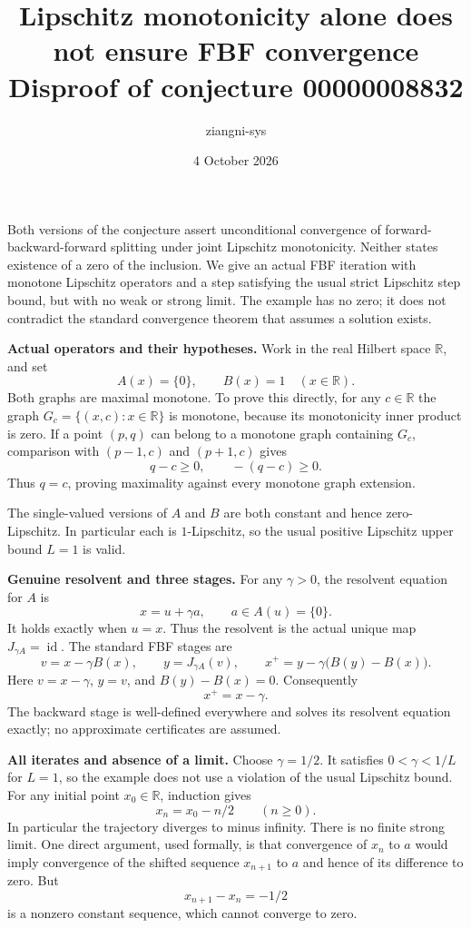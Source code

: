 \documentclass[11pt]{article}
\title{Lipschitz monotonicity alone does not ensure FBF convergence\\
\large Disproof of conjecture 00000008832}
\author{ziangni-sys}
\date{4 October 2026}
\begin{document}
\maketitle
Both versions of the conjecture assert unconditional convergence of
forward-backward-forward splitting under joint Lipschitz monotonicity.
Neither states existence of a zero of the inclusion. We give an actual
FBF iteration with monotone Lipschitz operators and a step satisfying
the usual strict Lipschitz step bound, but with no weak or strong limit.
The example has no zero; it does not contradict the standard convergence
theorem that assumes a solution exists.

\textbf{Actual operators and their hypotheses.}
Work in the real Hilbert space $\mathbb R$, and set
\[
 A(x)=\{0\},\qquad B(x)=1\quad(x\in\mathbb R).
\]
Both graphs are maximal monotone. To prove this directly, for any
$c\in\mathbb R$ the graph $G_c=\{(x,c):x\in\mathbb R\}$ is monotone,
because its monotonicity inner product is zero.
If a point $(p,q)$ can belong to a monotone graph containing $G_c$,
comparison with $(p-1,c)$ and $(p+1,c)$ gives
\[
 q-c\geq0,\qquad -(q-c)\geq0.
\]
Thus $q=c$, proving maximality against every monotone graph extension.

The single-valued versions of $A$ and $B$ are both constant and hence
zero-Lipschitz. In particular each is $1$-Lipschitz, so the usual
positive Lipschitz upper bound $L=1$ is valid.

\textbf{Genuine resolvent and three stages.}
For any $\gamma>0$, the resolvent equation for $A$ is
\[
 x=u+\gamma a,\qquad a\in A(u)=\{0\}.
\]
It holds exactly when $u=x$. Thus the resolvent is the actual unique map
$J_{\gamma A}=\operatorname{id}$.
The standard FBF stages are
\[
 v=x-\gamma B(x),\qquad
 y=J_{\gamma A}(v),\qquad
 x^+=y-\gamma\bigl(B(y)-B(x)\bigr).
\]
Here $v=x-\gamma$, $y=v$, and $B(y)-B(x)=0$. Consequently
\[
 x^+=x-\gamma.
\]
The backward stage is well-defined everywhere and solves its resolvent
equation exactly; no approximate certificates are assumed.

\newpage
\textbf{All iterates and absence of a limit.}
Choose $\gamma=1/2$. It satisfies $0<\gamma<1/L$ for $L=1$,
so the example does not use a violation of the usual Lipschitz bound.
For any initial point $x_0\in\mathbb R$, induction gives
\[
 x_n=x_0-n/2\qquad(n\geq0).
\]
In particular the trajectory diverges to minus infinity.
There is no finite strong limit. One direct argument, used formally,
is that convergence of $x_n$ to $a$ would imply convergence of the shifted
sequence $x_{n+1}$ to $a$ and hence of its difference to zero. But
\[
 x_{n+1}-x_n=-1/2
\]
is a nonzero constant sequence, which cannot converge to zero.
\end{document}
